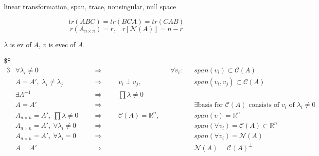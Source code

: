 \documentclass[
]{book}
\begin{document}
{{{linear transformation, span, trace, nonsingular, null space

\[
tr(ABC) = tr(BCA)=tr(CAB)
\]
\[
r(A_{n \times n})=r, \; \; \; r[\mathcal{N}(A)] = n-r
\]

\(\lambda\) is ev of \(A\), \(v\) is evec of \(A\).

\$\$
\begin{alignat}{3}

&\forall \lambda_i \not = 0 
&&\; \; \; \Longrightarrow \; \; \; 
&&
&& \forall v_i : 
&& span(v_i) \subset \mathcal{C}(A)

\\

&A = A', \; \lambda_i \not = \lambda_j 
&&\; \; \; \Longrightarrow \; \; \; 
&& v_i \perp v_j,
&&
&&span(v_i, v_j) \subset \mathcal{C}(A)


\\

&\exists A^{-1} 
&&\; \; \; \Longrightarrow \; \; \; 
&& \prod \lambda\not = 0
&&
&&

\\

&A = A'
&&\; \; \; \Longrightarrow \; \; \; 
&& 
&&
&&\exists \text{basis for } \mathcal{C}(A) \text{ consists of } v_i \text{ of } \lambda_i \not = 0



\\

&A_{n \times n} = A', \; \prod \lambda \not = 0 
&&\; \; \; \Longrightarrow \; \; \; 
&& \mathcal C (A)=\mathbb R^n,
&&
&&span( v) = \mathbb{R}^n



\\

&A_{n \times n} = A', \; \forall \lambda_i \not = 0 
&&\; \; \; \Longrightarrow \; \; \; 
&& 
&&
&&span(\forall v_i) = \mathcal{C}(A) \subset \mathbb{R}^n






\\

&A_{n \times n} = A', \; \forall \lambda_i  = 0 
&&\; \; \; \Longrightarrow \; \; \; 
&& 
&&
&&span(\forall v_i) = \mathcal{N}(A)

\\

&A = A'
&&\; \; \; \Longrightarrow \; \; \; 
&& 
&&
&&\mathcal{N}(A) = \mathcal C (A)^\perp

\\


\end{alignat}}}}
\end{document}
